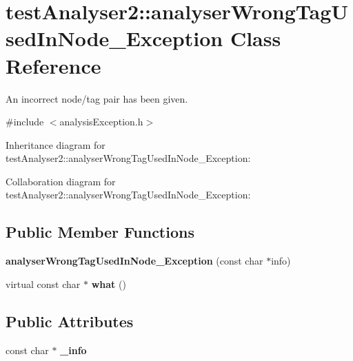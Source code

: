 \hypertarget{classtestAnalyser2_1_1analyserWrongTagUsedInNode__Exception}{}\section{test\+Analyser2\+::analyser\+Wrong\+Tag\+Used\+In\+Node\+\_\+\+Exception Class Reference}
\label{classtestAnalyser2_1_1analyserWrongTagUsedInNode__Exception}


An incorrect node/tag pair has been given.  




{\ttfamily \#include $<$analysis\+Exception.\+h$>$}



Inheritance diagram for test\+Analyser2\+::analyser\+Wrong\+Tag\+Used\+In\+Node\+\_\+\+Exception\+:


Collaboration diagram for test\+Analyser2\+::analyser\+Wrong\+Tag\+Used\+In\+Node\+\_\+\+Exception\+:
\subsection*{Public Member Functions}
\begin{DoxyCompactItemize}
\item 
\mbox{\label{classtestAnalyser2_1_1analyserWrongTagUsedInNode__Exception_a35a42281e4a2d0df20f3b3d7ed13ccc9}} 
{\bfseries analyser\+Wrong\+Tag\+Used\+In\+Node\+\_\+\+Exception} (const char $\ast$info)
\item 
\mbox{\label{classtestAnalyser2_1_1analyserWrongTagUsedInNode__Exception_a54b07197129c4adc8914796554f35cb7}} 
virtual const char $\ast$ {\bfseries what} ()
\end{DoxyCompactItemize}
\subsection*{Public Attributes}
\begin{DoxyCompactItemize}
\item 
\mbox{\label{classtestAnalyser2_1_1analyserWrongTagUsedInNode__Exception_aff811feec9dcad10d2c4bab4ef2946ef}} 
const char $\ast$ {\bfseries \+\_\+info}
\end{DoxyCompactItemize}
